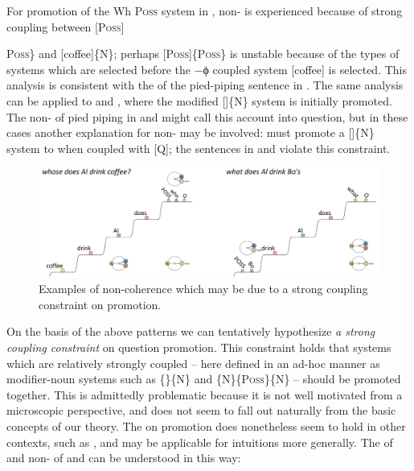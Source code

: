 For promotion of the {\textbar}Wh P\textsc{oss}{\textbar} system in , non- is experienced because of strong coupling between [P\textsc{oss}]{P\textsc{oss}\} and [coffee]\{N\}; perhaps [P\textsc{oss}]\{P\textsc{oss}\} is unstable because of the types of systems which are selected before the −ϕ coupled system [coffee] is selected. This analysis is consistent with the  of the pied-piping sentence in . The same analysis can be applied to  and , where the modified []\{N\} system is initially promoted. The non- of pied piping in  and  might call this account into question, but in these cases another explanation for non- may be involved:  must promote a []\{N\} system to  when coupled with [Q]; the sentences in  and  violate this constraint. 

  
\begin{figure}
\includegraphics[width=\textwidth]{figures/Tilsen-img166.png}
\caption{Examples of non-coherence which may be due to a strong coupling constraint on promotion.}
\label{fig:7:22}
\end{figure}
 

  On the basis of the above patterns we can tentatively hypothesize \textit{a strong coupling constraint} on question promotion. This constraint holds that systems which are relatively strongly coupled -- here defined in an ad-hoc manner as modifier-noun systems such as \{\}\{N\} and \{N\}\{P\textsc{oss}\}\{N\} -- should be promoted together. This is admittedly problematic because it is not well motivated from a microscopic perspective, and does not seem to fall out naturally from the basic concepts of our theory. The  on promotion does nonetheless seem to hold in other contexts, such as , and may be applicable for  intuitions more generally. The  of  and non- of  and  can be understood in this way:

}
